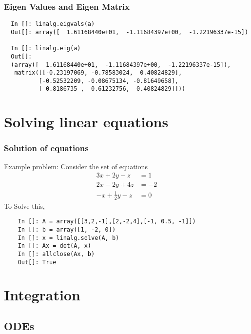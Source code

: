 \documentclass[14pt,compress]{beamer}
\begin{document}
\begin{frame}[fragile]
\frametitle{Eigen Values and Eigen Matrix}
\begin{small}
\begin{lstlisting}
  In []: linalg.eigvals(a)
  Out[]: array([  1.61168440e+01,  -1.11684397e+00,  -1.22196337e-15])

  In []: linalg.eig(a)
  Out[]: 
  (array([  1.61168440e+01,  -1.11684397e+00,  -1.22196337e-15]),
   matrix([[-0.23197069, -0.78583024,  0.40824829],
          [-0.52532209, -0.08675134, -0.81649658],
          [-0.8186735 ,  0.61232756,  0.40824829]]))
\end{lstlisting}
\end{small}
\end{frame}

\section{Solving linear equations}
\begin{frame}[fragile]
\frametitle{Solution of equations}
Example problem: Consider the set of equations
\vspace{-0.1in}
  \begin{align*}
    3x + 2y - z  & = 1 \\
    2x - 2y + 4z  & = -2 \\
    -x + \frac{1}{2}y -z & = 0
  \end{align*}
\vspace{-0.08in}
  To Solve this, 
  \begin{lstlisting}
    In []: A = array([[3,2,-1],[2,-2,4],[-1, 0.5, -1]])
    In []: b = array([1, -2, 0])
    In []: x = linalg.solve(A, b)
    In []: Ax = dot(A, x)
    In []: allclose(Ax, b)
    Out[]: True
  \end{lstlisting}
\end{frame}

\section{Integration}

\subsection{ODEs}
\end{document}
